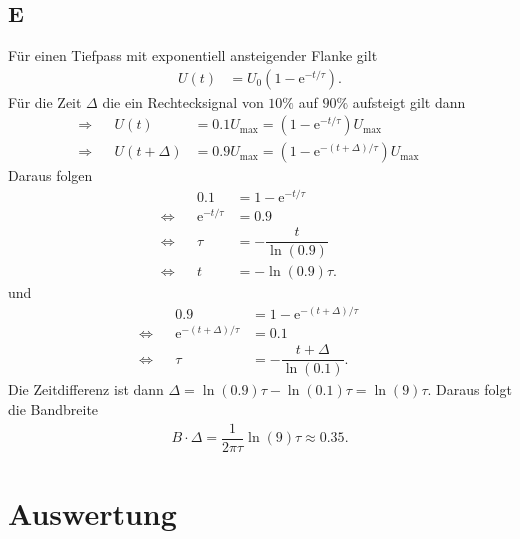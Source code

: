\documentclass[a4paper,10pt]{article}
\numberwithin{equation}{section}
\begin{document}
\subsection{E}
Für einen Tiefpass mit exponentiell ansteigender Flanke gilt
\begin{align} 
        U\left(t\right)&=U_0\left(1-\text{e}^{-t/\tau }\right)
.\end{align} 
Für die Zeit $\Delta $ die ein Rechtecksignal von $10\%$ auf $90\%$ aufsteigt gilt dann
\begin{align} 
        \Rightarrow &&U\left(t\right)&=0.1U_{\text{max}}=\left(1-\text{e}^{-t/\tau }\right)U_{\text{max}}&&\\
        \Rightarrow &&U\left(t+\Delta \right)&=0.9U_{\text{max}}=\left(1-\text{e}^{-\left(t+\Delta \right)/\tau }\right)U_{\text{max}}&&
\end{align} 
Daraus folgen
\begin{align} 
        &&0.1&=1-\text{e}^{-t/\tau }&&\\
        \Leftrightarrow &&\text{e}^{-t/\tau }&=0.9&&\nonumber \\
        \Leftrightarrow &&\tau &=-\dfrac{t}{\ln\left(0.9\right)}&&\nonumber \\
        \Leftrightarrow &&t&=-\ln(0.9)\tau. &&\label{eq:t}
\end{align} 
und 
\begin{align} 
        &&0.9&=1-\text{e}^{-\left(t+\Delta \right)/\tau }&&\\
        \Leftrightarrow &&\text{e}^{-\left(t+\Delta \right)/\tau }&=0.1&&\nonumber \\
        \Leftrightarrow &&\tau &=-\dfrac{t+\Delta }{\ln\left(0.1\right)}.&&\label{eq:delta}
\end{align} 
Die Zeitdifferenz ist dann $\Delta =\ln(0.9)\tau -\ln(0.1)\tau =\ln(9)\tau $.
Daraus folgt die Bandbreite
\begin{align} 
        B\cdot \Delta =\dfrac{1}{2\pi \tau }\ln(9)\tau \approx 0.35
.\end{align} 

\newpage
\section{Auswertung}
\end{document}
